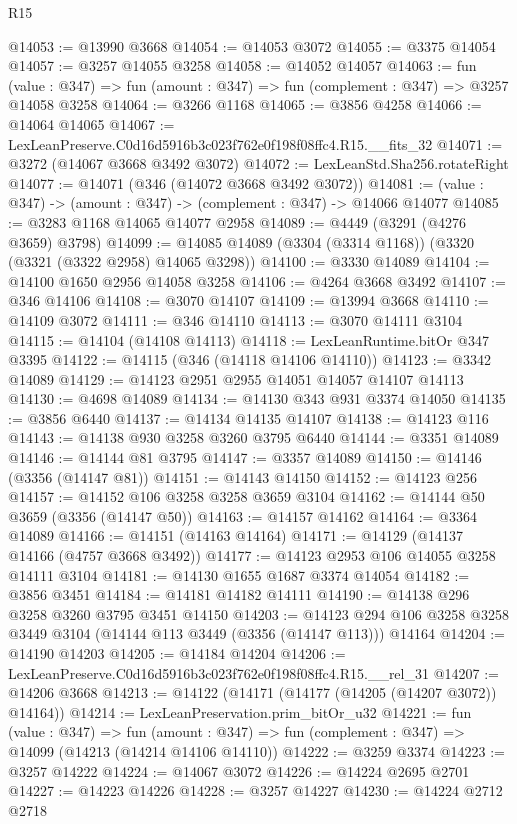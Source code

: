 \begin{lexlean}{R15}
\begin{coremodule}
@14053 := @13990 @3668
@14054 := @14053 @3072
@14055 := @3375 @14054
@14057 := @3257 @14055 @3258
@14058 := @14052 @14057
@14063 := fun (value : @347) => fun (amount : @347) => fun (complement : @347) => @3257 @14058 @3258
@14064 := @3266 @1168
@14065 := @3856 @4258
@14066 := @14064 @14065
@14067 := LexLeanPreserve.C0d16d5916b3c023f762e0f198f08ffc4.R15.__fits_32
@14071 := @3272 (@14067 @3668 @3492 @3072)
@14072 := LexLeanStd.Sha256.rotateRight
@14077 := @14071 (@346 (@14072 @3668 @3492 @3072))
@14081 := (value : @347) -> (amount : @347) -> (complement : @347) -> @14066 @14077
@14085 := @3283 @1168 @14065 @14077 @2958
@14089 := @4449 (@3291 (@4276 @3659) @3798)
@14099 := @14085 @14089 (@3304 (@3314 @1168)) (@3320 (@3321 (@3322 @2958) @14065 @3298))
@14100 := @3330 @14089
@14104 := @14100 @1650 @2956 @14058 @3258
@14106 := @4264 @3668 @3492
@14107 := @346 @14106
@14108 := @3070 @14107
@14109 := @13994 @3668
@14110 := @14109 @3072
@14111 := @346 @14110
@14113 := @3070 @14111 @3104
@14115 := @14104 (@14108 @14113)
@14118 := LexLeanRuntime.bitOr @347 @3395
@14122 := @14115 (@346 (@14118 @14106 @14110))
@14123 := @3342 @14089
@14129 := @14123 @2951 @2955 @14051 @14057 @14107 @14113
@14130 := @4698 @14089
@14134 := @14130 @343 @931 @3374 @14050
@14135 := @3856 @6440
@14137 := @14134 @14135 @14107
@14138 := @14123 @116
@14143 := @14138 @930 @3258 @3260 @3795 @6440
@14144 := @3351 @14089
@14146 := @14144 @81 @3795
@14147 := @3357 @14089
@14150 := @14146 (@3356 (@14147 @81))
@14151 := @14143 @14150
@14152 := @14123 @256
@14157 := @14152 @106 @3258 @3258 @3659 @3104
@14162 := @14144 @50 @3659 (@3356 (@14147 @50))
@14163 := @14157 @14162
@14164 := @3364 @14089
@14166 := @14151 (@14163 @14164)
@14171 := @14129 (@14137 @14166 (@4757 @3668 @3492))
@14177 := @14123 @2953 @106 @14055 @3258 @14111 @3104
@14181 := @14130 @1655 @1687 @3374 @14054
@14182 := @3856 @3451
@14184 := @14181 @14182 @14111
@14190 := @14138 @296 @3258 @3260 @3795 @3451 @14150
@14203 := @14123 @294 @106 @3258 @3258 @3449 @3104 (@14144 @113 @3449 (@3356 (@14147 @113))) @14164
@14204 := @14190 @14203
@14205 := @14184 @14204
@14206 := LexLeanPreserve.C0d16d5916b3c023f762e0f198f08ffc4.R15.__rel_31
@14207 := @14206 @3668
@14213 := @14122 (@14171 (@14177 (@14205 (@14207 @3072)) @14164))
@14214 := LexLeanPreservation.prim_bitOr_u32
@14221 := fun (value : @347) =>
  fun (amount : @347) => fun (complement : @347) => @14099 (@14213 (@14214 @14106 @14110))
@14222 := @3259 @3374
@14223 := @3257 @14222
@14224 := @14067 @3072
@14226 := @14224 @2695 @2701
@14227 := @14223 @14226
@14228 := @3257 @14227
@14230 := @14224 @2712 @2718

\end{coremodule}
\end{lexlean}
